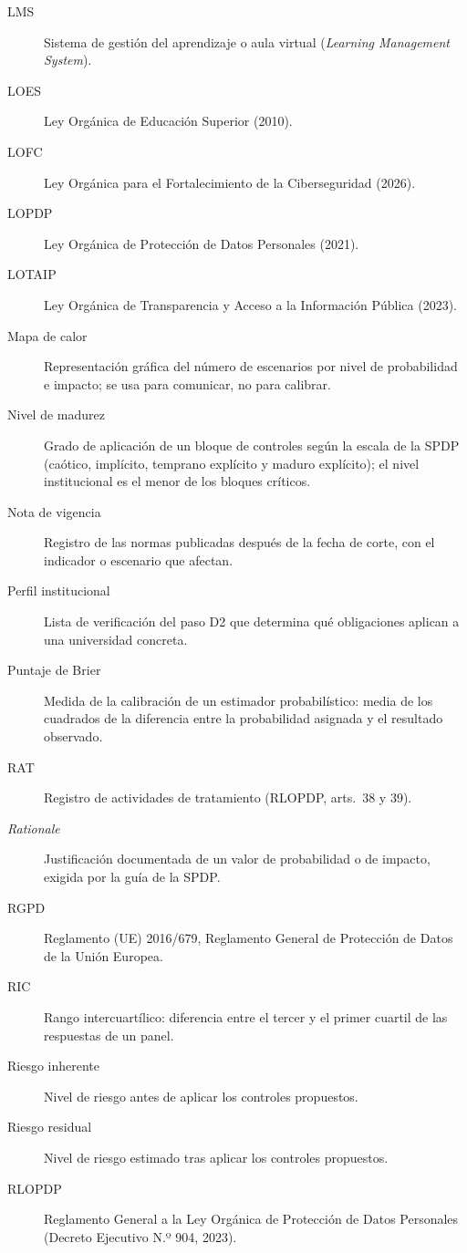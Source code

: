 \begin{description}
  \item[LMS] Sistema de gestión del aprendizaje o aula virtual (\textit{Learning Management System}).
  \item[LOES] Ley Orgánica de Educación Superior (2010).
  \item[LOFC] Ley Orgánica para el Fortalecimiento de la Ciberseguridad (2026).
  \item[LOPDP] Ley Orgánica de Protección de Datos Personales (2021).
  \item[LOTAIP] Ley Orgánica de Transparencia y Acceso a la Información Pública (2023).
  \item[Mapa de calor] Representación gráfica del número de escenarios por nivel de probabilidad e impacto; se usa para comunicar, no para calibrar.
  \item[Nivel de madurez] Grado de aplicación de un bloque de controles según la escala de la SPDP (caótico, implícito, temprano explícito y maduro explícito); el nivel institucional es el menor de los bloques críticos.
  \item[Nota de vigencia] Registro de las normas publicadas después de la fecha de corte, con el indicador o escenario que afectan.
  \item[Perfil institucional] Lista de verificación del paso D2 que determina qué obligaciones aplican a una universidad concreta.
  \item[Puntaje de Brier] Medida de la calibración de un estimador probabilístico: media de los cuadrados de la diferencia entre la probabilidad asignada y el resultado observado.
  \item[RAT] Registro de actividades de tratamiento (RLOPDP, arts.~38 y 39).
  \item[\textit{Rationale}] Justificación documentada de un valor de probabilidad o de impacto, exigida por la guía de la SPDP.
  \item[RGPD] Reglamento (UE) 2016/679, Reglamento General de Protección de Datos de la Unión Europea.
  \item[RIC] Rango intercuartílico: diferencia entre el tercer y el primer cuartil de las respuestas de un panel.
  \item[Riesgo inherente] Nivel de riesgo antes de aplicar los controles propuestos.
  \item[Riesgo residual] Nivel de riesgo estimado tras aplicar los controles propuestos.
  \item[RLOPDP] Reglamento General a la Ley Orgánica de Protección de Datos Personales (Decreto Ejecutivo N.º 904, 2023).

\end{description}
